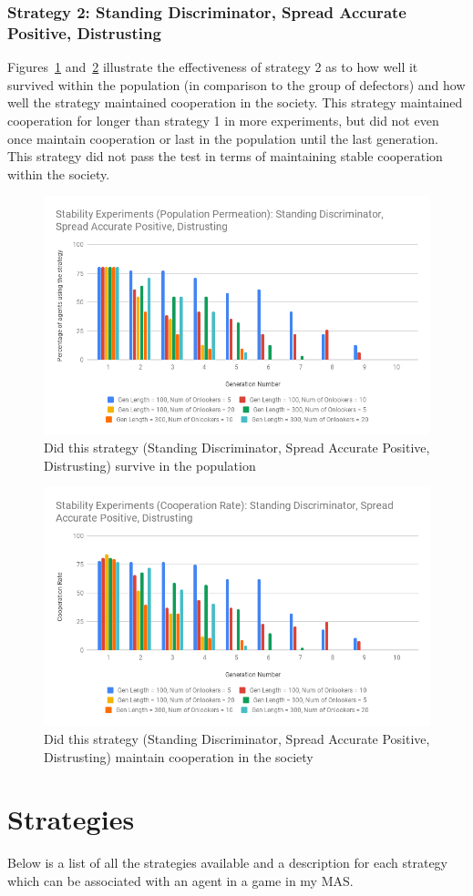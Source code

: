 \documentclass[]{final_report}
\begin{document}
\subsubsection{Strategy 2: Standing Discriminator, Spread Accurate Positive, Distrusting}
Figures~\ref{fig:sdsapdtStabPop} and~\ref{fig:sdsapdtStabCoop} illustrate the effectiveness of strategy 2 as to how well it survived within the population (in comparison to the group of defectors) and how well the strategy maintained cooperation in the society. This strategy maintained cooperation for longer than strategy 1 in more experiments, but did not even once maintain cooperation or last in the population until the last generation. This strategy did not pass the test in terms of maintaining stable cooperation within the society.
\begin{figure}
\begin{framed}
	\includegraphics[width=\textwidth]{sdsapdtStabPop.png}
	\caption{Did this strategy (Standing Discriminator, Spread Accurate Positive, Distrusting) survive in the population}
	\label{fig:sdsapdtStabPop}
\end{framed}
\end{figure}
\begin{figure}
\begin{framed}
	\includegraphics[width=\textwidth]{sdsapdtStabCoop.png}
	\caption{Did this strategy (Standing Discriminator, Spread Accurate Positive, Distrusting) maintain cooperation in the society}
	\label{fig:sdsapdtStabCoop}
\end{framed}
\end{figure}

\section{Strategies}
\label{appendix:strats}
Below is a list of all the strategies available and a description for each strategy which can be associated with an agent in a game in my MAS.
\inputminted[breaklines]{json}{strategies.json}
\end{document}

